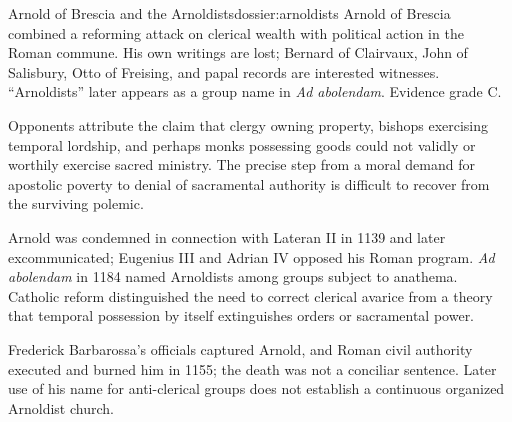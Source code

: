 \begin{heresydossier}{Arnold of Brescia and the Arnoldists}{dossier:arnoldists}
\objectfield Arnold of Brescia combined a reforming attack on clerical wealth with political action in the Roman commune. His own writings are lost; Bernard of Clairvaux, John of Salisbury, Otto of Freising, and papal records are interested witnesses. ``Arnoldists'' later appears as a group name in \emph{Ad abolendam}. Evidence grade C.

\propositionfield Opponents attribute the claim that clergy owning property, bishops exercising temporal lordship, and perhaps monks possessing goods could not validly or worthily exercise sacred ministry. The precise step from a moral demand for apostolic poverty to denial of sacramental authority is difficult to recover from the surviving polemic.

\responsefield Arnold was condemned in connection with Lateran II in 1139 and later excommunicated; Eugenius III and Adrian IV opposed his Roman program. \emph{Ad abolendam} in 1184 named Arnoldists among groups subject to anathema. Catholic reform distinguished the need to correct clerical avarice from a theory that temporal possession by itself extinguishes orders or sacramental power.

\aftermathfield Frederick Barbarossa's officials captured Arnold, and Roman civil authority executed and burned him in 1155; the death was not a conciliar sentence. Later use of his name for anti-clerical groups does not establish a continuous organized Arnoldist church.
\end{heresydossier}

